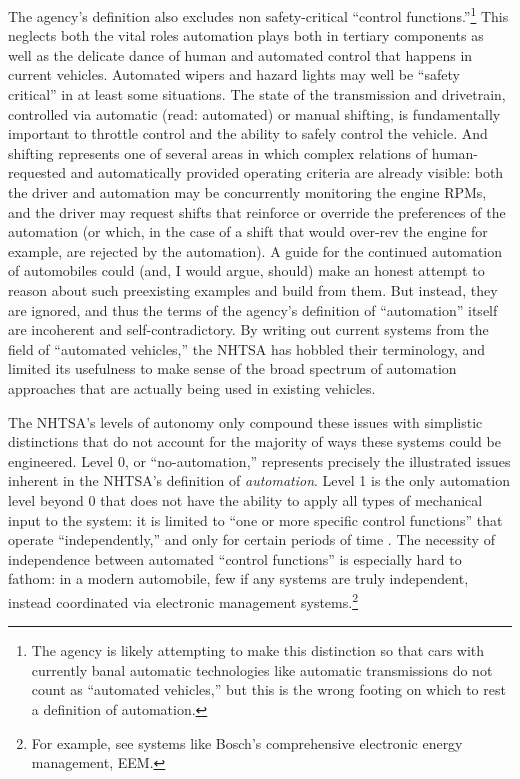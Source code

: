 The agency's definition also excludes non safety-critical ``control
functions.''\footnote{The agency is likely attempting to make this distinction
so that cars with currently banal automatic technologies like
automatic transmissions do 
not count as ``automated vehicles,'' but this is the wrong footing on
which to rest a definition of automation.} This neglects both the
vital roles automation plays both in tertiary components as well as
the delicate dance of human and automated control that happens in
current vehicles. Automated wipers and hazard
lights may well be ``safety critical'' in at least some situations.
The state of the transmission 
and drivetrain, controlled via automatic (read: automated) or manual
shifting, is fundamentally important to throttle control and the
ability to safely control the vehicle. And shifting represents one of
several areas
in which complex relations of human-requested and
automatically provided operating criteria are already visible: both
the driver and automation may be concurrently monitoring the engine
RPMs, and the driver may request shifts that reinforce or override the
preferences of the automation (or which, in the case of a shift that would
over-rev the engine for example, are rejected by the automation). A guide for the
continued automation of automobiles could (and, I would argue, should)
make an honest attempt to reason about such preexisting examples and
build from them. But instead, they are ignored, and thus the
terms of the agency's definition of ``automation'' itself are incoherent
and self-contradictory. By writing out current systems from the field
of ``automated vehicles,'' the NHTSA has hobbled their terminology,
and limited its usefulness to make sense of the broad spectrum of automation
approaches that are actually being used in existing vehicles.


The NHTSA's levels of autonomy only compound these
issues with simplistic distinctions that do not account for the
majority of ways these systems could be engineered. Level 0, or
``no-automation,'' represents 
precisely the illustrated issues inherent in the NHTSA's definition of
\emph{automation}. Level 
1 is the only automation level beyond 0 that does not have the
ability to apply all types of mechanical input to the system: it is
limited to ``one or more specific control functions'' that operate
``independently,'' and only for certain periods of time \cite[p. 4]{NHTSA}. The
necessity of independence between automated ``control functions'' is
especially hard to fathom: in a modern automobile, few if any systems
are truly independent, instead coordinated via electronic management
systems.\footnote{For example, see systems like Bosch's comprehensive
  electronic energy management, EEM.} 

